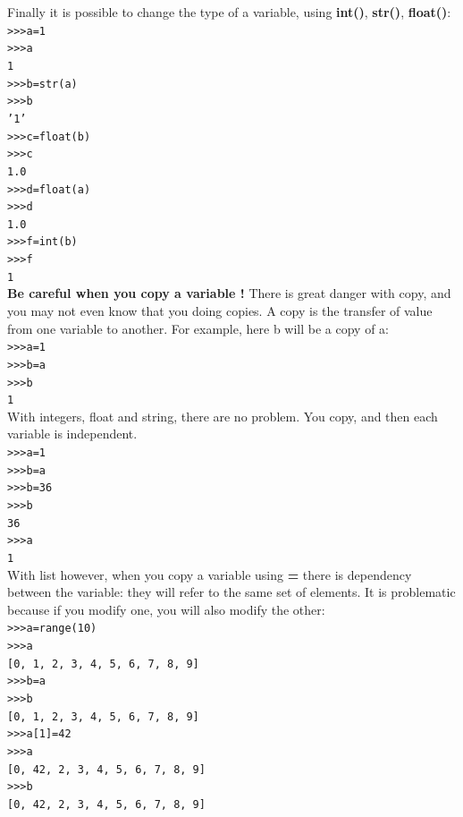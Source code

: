 \documentclass[article,10pt]{scrartcl}
\begin{document}
Finally it is possible to change the type of a variable, using \textbf{int()}, \textbf{str()}, \textbf{float()}:\\
\texttt{>>>a=1}\\
\texttt{>>>a}\\
\texttt{1}\\
\texttt{>>>b=str(a)}\\
\texttt{>>>b}\\
\texttt{'1'}\\
\texttt{>>>c=float(b)}\\
\texttt{>>>c}\\
\texttt{1.0}\\
\texttt{>>>d=float(a)}\\
\texttt{>>>d}\\
\texttt{1.0}\\
\texttt{>>>f=int(b)}\\
\texttt{>>>f}\\
\texttt{1}\\

\textbf{Be careful when you copy a variable !} There is great danger with copy, and you may not even know that you doing copies. A copy is the transfer of value from one variable to another. For example, here b will be a copy of a:\\
\texttt{>>>a=1}\\
\texttt{>>>b=a}\\
\texttt{>>>b}\\
\texttt{1}\\
With integers, float and string, there are no problem. You copy, and then each variable is independent.\\
\texttt{>>>a=1}\\
\texttt{>>>b=a}\\
\texttt{>>>b=36}\\
\texttt{>>>b}\\
\texttt{36}\\
\texttt{>>>a}\\
\texttt{1}\\

With list however, when you copy a variable using \textbf{=} there is dependency between the variable: they will refer to the same set of elements. It is problematic because if you modify one, you will also modify the other:\\
\texttt{>>>a=range(10)}\\
\texttt{>>>a}\\
\texttt{[0, 1, 2, 3, 4, 5, 6, 7, 8, 9]}\\
\texttt{>>>b=a}\\
\texttt{>>>b}\\
\texttt{[0, 1, 2, 3, 4, 5, 6, 7, 8, 9]}\\
\texttt{>>>a[1]=42}\\
\texttt{>>>a}\\
\texttt{[0, 42, 2, 3, 4, 5, 6, 7, 8, 9]}\\
\texttt{>>>b}\\
\texttt{[0, 42, 2, 3, 4, 5, 6, 7, 8, 9]}\\
\end{document}
